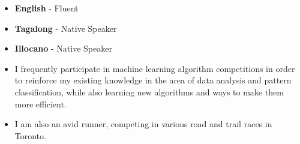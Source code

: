 %
%
%

\twocolumnsection
{
\vspace{1em}
\begin{itemize}
	\item \textbf{English} - Fluent
	\item \textbf{Tagalong} - Native Speaker
	\item \textbf{Illocano} - Native Speaker
\end{itemize}}
{
\vspace{1em}
\begin{itemize}
	\item I frequently participate in machine learning algorithm competitions in order to reinforce my existing knowledge in the area of data analysis and pattern classification, while also learning new algorithms and ways to make them more efficient.
	\item I am also an avid runner, competing in various road and trail races in Toronto.                    
\end{itemize}
}
